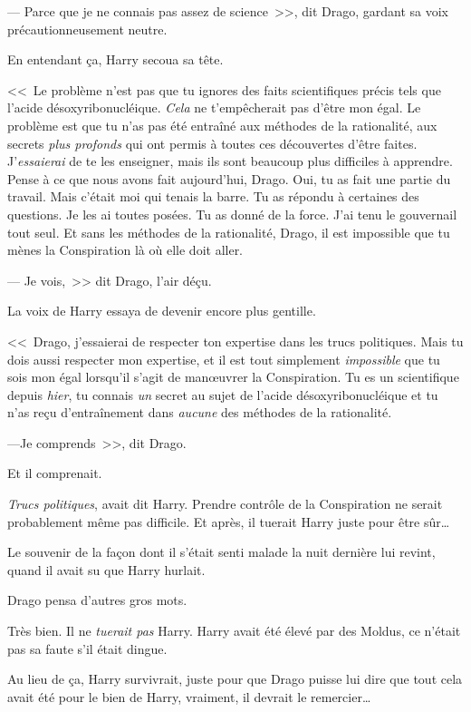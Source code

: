 --- Parce que je ne connais pas assez de science~>>, dit Drago, gardant sa voix précautionneusement neutre.

En entendant ça, Harry secoua sa tête.

<<~Le problème n'est pas que tu ignores des faits scientifiques précis tels que l'acide désoxyribonucléique. \emph{Cela} ne t'empêcherait pas d'être mon égal. Le problème est que tu n'as pas été entraîné aux méthodes de la rationalité, aux secrets \emph{plus profonds} qui ont permis à toutes ces découvertes d'être faites. J'\emph{essaierai} de te les enseigner, mais ils sont beaucoup plus difficiles à apprendre. Pense à ce que nous avons fait aujourd'hui, Drago. Oui, tu as fait une partie du travail. Mais c'était moi qui tenais la barre. Tu as répondu à certaines des questions. Je les ai toutes posées. Tu as donné de la force. J'ai tenu le gouvernail tout seul. Et sans les méthodes de la rationalité, Drago, il est impossible que tu mènes la Conspiration là où elle doit aller.

--- Je vois,~>> dit Drago, l'air déçu.

La voix de Harry essaya de devenir encore plus gentille.

<<~Drago, j'essaierai de respecter ton expertise dans les trucs politiques. Mais tu dois aussi respecter mon expertise, et il est tout simplement \emph{impossible} que tu sois mon égal lorsqu'il s'agit de manœuvrer la Conspiration. Tu es un scientifique depuis \emph{hier}, tu connais \emph{un} secret au sujet de l'acide désoxyribonucléique et tu n'as reçu d'entraînement dans \emph{aucune} des méthodes de la rationalité.

---Je comprends~>>, dit Drago.

Et il comprenait.

\emph{Trucs politiques}, avait dit Harry. Prendre contrôle de la Conspiration ne serait probablement même pas difficile. Et après, il tuerait Harry juste pour être sûr…

Le souvenir de la façon dont il s'était senti malade la nuit dernière lui revint, quand il avait su que Harry hurlait.

Drago pensa d'autres gros mots.

Très bien. Il ne \emph{tuerait pas} Harry. Harry avait été élevé par des Moldus, ce n'était pas sa faute s'il était dingue.

Au lieu de ça, Harry survivrait, juste pour que Drago puisse lui dire que tout cela avait été pour le bien de Harry, vraiment, il devrait le remercier…

